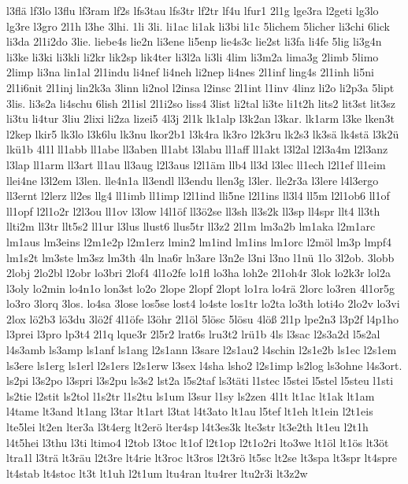 {l3flä
lf3lo
l3flu
lf3ram
lf2s
lfs3tau
lfs3tr
lf2tr
lf4u
lfur1
2l1g
lge3ra
l2geti
lg3lo
lg3re
l3gro
2l1h
l3he
3lhi.
1li
3li.
li1ac
li1ak
li3bi
li1c
5lichem
5licher
li3chi
6lick
li3da
2l1i2do
3lie.
liebe4s
lie2n
li3ene
li5enp
lie4s3c
lie2st
li3fa
li4fe
5lig
li3g4n
li3ke
li3ki
li3kli
li2kr
lik2sp
lik4ter
li3l2a
li3li
4lim
li3m2a
lima3g
2limb
5limo
2limp
li3na
lin1al
2l1indu
li4nef
li4neh
li2nep
li4nes
2l1inf
ling4s
2l1inh
li5ni
2l1i6nit
2l1inj
lin2k3a
3linn
li2nol
l2insa
l2insc
2l1int
l1inv
4linz
li2o
li2p3a
5lipt
3lis.
li3s2a
li4schu
6lish
2l1isl
2l1i2so
liss4
3list
li2tal
li3te
li1t2h
lits2
lit3st
lit3sz
li3tu
li4tur
3liu
2lixi
li2za
lizei5
4l3j
2l1k
lk1alp
l3k2an
l3kar.
lk1arm
l3ke
lken3t
l2kep
lkir5
lk3lo
l3k6lu
lk3nu
lkor2b1
l3k4ra
lk3ro
l2k3ru
lk2s3
lk3sä
lk4stä
l3k2ü
lkü1b
4l1l
ll1abb
ll1abe
ll3aben
ll1abt
l3labu
ll1aff
ll1akt
l3l2al
l2l3a4m
l2l3anz
l3lap
ll1arm
ll3art
ll1au
ll3aug
l2l3aus
l2l1äm
llb4
ll3d
l3lec
ll1ech
l2l1ef
ll1eim
llei4ne
l3l2em
l3len.
lle4n1a
ll3endl
ll3endu
llen3g
l3ler.
lle2r3a
l3lere
l4l3ergo
ll3ernt
l2lerz
ll2es
llg4
ll1imb
ll1imp
l2l1ind
lli5ne
l2l1ins
ll3l4
ll5m
l2l1ob6
ll1of
ll1opf
l2l1o2r
l2l3ou
ll1ov
l3low
l4l1öf
ll3ö2se
ll3sh
ll3s2k
ll3sp
ll4spr
llt4
ll3th
llti2m
ll3tr
llt5s2
ll1ur
l3lus
llust6
llus5tr
ll3z2
2l1m
lm3a2b
lm1aka
l2m1arc
lm1aus
lm3eins
l2m1e2p
l2m1erz
lmin2
lm1ind
lm1ins
lm1orc
l2möl
lm3p
lmpf4
lm1s2t
lm3ste
lm3sz
lm3th
4ln
lna6r
ln3are
l3n2e
l3ni
l3no
l1nü
1lo
3l2ob.
3lobb
2lobj
2lo2bl
l2obr
lo3bri
2lof4
4l1o2fe
lo1fl
lo3ha
loh2e
2l1oh4r
3lok
lo2k3r
lol2a
l3oly
lo2min
lo4n1o
lon3st
lo2o
2lope
2lopf
2lopt
lo1ra
lo4rä
2lorc
lo3ren
4l1or5g
lo3ro
3lorq
3los.
lo4sa
3lose
los5se
lost4
lo4ste
los1tr
lo2ta
lo3th
loti4o
2lo2v
lo3vi
2lox
lö2b3
lö3du
3lö2f
4l1öfe
l3öhr
2l1öl
5lösc
5lösu
4löß
2l1p
lpe2n3
l3p2f
l4p1ho
l3prei
l3pro
lp3t4
2l1q
lque3r
2l5r2
lrat6s
lru3t2
lrü1b
4ls
l3sac
l2s3a2d
l5s2al
l4s3amb
ls3amp
ls1anf
ls1ang
l2s1ann
l3sare
l2s1au2
l4schin
l2s1e2b
ls1ec
l2s1em
ls3ere
ls1erg
ls1erl
l2s1ers
l2s1erw
l3sex
l4sha
lsho2
l2s1imp
ls2log
ls3ohne
l4s3ort.
ls2pi
l3s2po
l3spri
l3s2pu
ls3s2
lst2a
l5s2taf
ls3täti
l1stec
l5stei
l5stel
l5steu
l1sti
ls2tie
l2stit
ls2tol
l1s2tr
l1s2tu
ls1um
l3sur
l1sy
ls2zen
4l1t
lt1ac
lt1ak
lt1am
l4tame
lt3and
lt1ang
l3tar
lt1art
l3tat
l4t3ato
lt1au
l5tef
lt1eh
lt1ein
l2t1eis
lte5lei
lt2en
lter3a
l3t4erg
lt2erö
lter4sp
l4t3es3k
lte3str
lt3e2th
lt1eu
l2t1h
l4t5hei
l3thu
l3ti
ltimo4
l2tob
l3toc
lt1of
l2t1op
l2t1o2ri
lto3we
lt1öl
lt1ös
lt3öt
ltra1l
l3trä
lt3räu
l2t3re
lt4rie
lt3roc
lt3ros
l2t3rö
lt5sc
lt2se
lt3spa
lt3spr
lt4spre
lt4stab
lt4stoc
lt3t
lt1uh
l2t1um
ltu4ran
ltu4rer
ltu2r3i
lt3z2w
}
